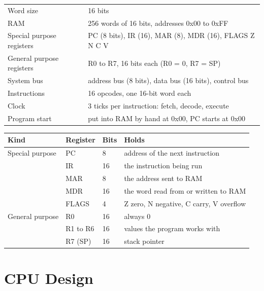 \documentclass[10pt]{article}
\makeatletter
\newenvironment{tablehere}{\par\vspace{8pt}\noindent\begin{minipage}{\linewidth}\centering\def\@captype{table}}{\end{minipage}\par\vspace{8pt}}
\makeatother
\begin{document}
\begin{tablehere}
\caption{SPARTAN-16 in short}
\label{tab:spec}
\begin{tabular}{@{}ll@{}}
\toprule
Word size & 16 bits \\
RAM & 256 words of 16 bits, addresses 0x00 to 0xFF \\
Special purpose registers & PC (8 bits), IR (16), MAR (8), MDR (16), FLAGS Z N C V \\
General purpose registers & R0 to R7, 16 bits each (R0 = 0, R7 = SP) \\
System bus & address bus (8 bits), data bus (16 bits), control bus \\
Instructions & 16 opcodes, one 16-bit word each \\
Clock & 3 ticks per instruction: fetch, decode, execute \\
Program start & put into RAM by hand at 0x00, PC starts at 0x00 \\
\bottomrule
\end{tabular}
\end{tablehere}

\begin{tablehere}
\caption{Registers}
\label{tab:regs}
\small
\begin{tabular}{@{}llll@{}}
\toprule
Kind & Register & Bits & Holds \\
\midrule
Special purpose & PC & 8 & address of the next instruction \\
 & IR & 16 & the instruction being run \\
 & MAR & 8 & the address sent to RAM \\
 & MDR & 16 & the word read from or written to RAM \\
 & FLAGS & 4 & Z zero, N negative, C carry, V overflow \\
\midrule
General purpose & R0 & 16 & always 0 \\
 & R1 to R6 & 16 & values the program works with \\
 & R7 (SP) & 16 & stack pointer \\
\bottomrule
\end{tabular}
\end{tablehere}

\clearpage
\section{CPU Design}\label{sec:cpu}
\end{document}
